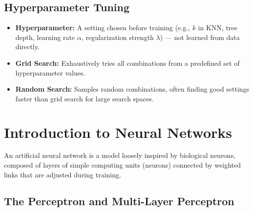 \documentclass[11pt,a4paper]{article}
\begin{document}
\subsection{Hyperparameter Tuning}
\begin{itemize}[leftmargin=*]
  \item \textbf{Hyperparameter:} A setting chosen before training (e.g., $k$ in KNN, tree depth, learning rate $\alpha$, regularization strength $\lambda$) --- not learned from data directly.
  \item \textbf{Grid Search:} Exhaustively tries all combinations from a predefined set of hyperparameter values.
  \item \textbf{Random Search:} Samples random combinations, often finding good settings faster than grid search for large search spaces.
\end{itemize}

\section{Introduction to Neural Networks}

\begin{definitionbox}
An artificial neural network is a model loosely inspired by biological neurons, composed of layers of simple computing units (neurons) connected by weighted links that are adjusted during training.
\end{definitionbox}

\subsection{The Perceptron and Multi-Layer Perceptron}
\begin{center}
\end{center}
\end{document}
